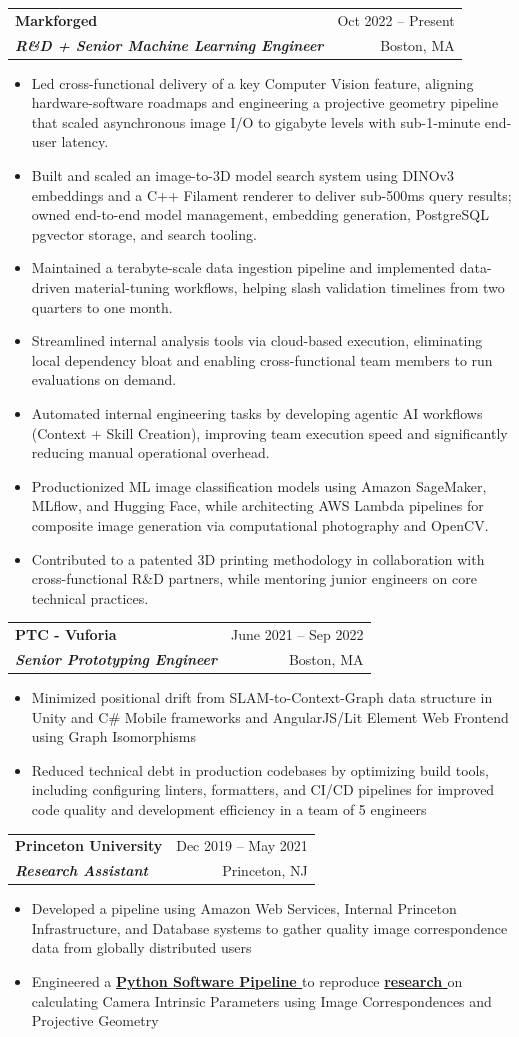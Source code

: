 \documentclass[letterpaper,10pt]{article}
\makeatletter
\renewcommand{\textbf}[1]{\textcolor{title}{\bfseries #1}}
\newcommand{\resumeItem}[1]{
\item\footnotesize{
    {#1 \vspace{-1pt}}
  }
}
\newcommand{\resumeSubheading}[4]{
  \vspace{-1pt}
\item
  \begin{tabular*}{\textwidth}[t]{l@{\extracolsep{\fill}}r}
    \textbf{#1} & {\color{dark-grey}\small #2}\vspace{1pt}\\ %
    \textit{#3} & {\color{dark-grey} \small #4}\\ %
  \end{tabular*}\vspace{-4pt}
}
\newcommand{\resumeItemListStart}{
\begin{itemize}}
\newcommand{\resumeItemListEnd}{
\end{itemize}\vspace{0pt}}
\makeatother
\begin{document}
\resumeSubheading
{\textbf{Markforged}}{Oct 2022 -- Present}
{\textbf{R\&D + Senior Machine Learning Engineer}}{Boston, MA}
\resumeItemListStart
  \resumeItem{Led cross-functional delivery of a key Computer Vision feature, aligning hardware-software roadmaps and engineering a projective geometry pipeline that scaled asynchronous image I/O to gigabyte levels with sub-1-minute end-user latency.}
  \resumeItem{Built and scaled an image-to-3D model search system using DINOv3 embeddings and a C++ Filament renderer to deliver sub-500ms query results; owned end-to-end model management, embedding generation, PostgreSQL pgvector storage, and search tooling.}
  \resumeItem{Maintained a terabyte-scale data ingestion pipeline and implemented data-driven material-tuning workflows, helping slash validation timelines from two quarters to one month.}
  \resumeItem{Streamlined internal analysis tools via cloud-based execution, eliminating local dependency bloat and enabling cross-functional team members to run evaluations on demand.}
  \resumeItem{Automated internal engineering tasks by developing agentic AI workflows (Context + Skill Creation), improving team execution speed and significantly reducing manual operational overhead.}
  \resumeItem{Productionized ML image classification models using Amazon SageMaker, MLflow, and Hugging Face, while architecting AWS Lambda pipelines for composite image generation via computational photography and OpenCV.}
  \resumeItem{Contributed to a patented 3D printing methodology in collaboration with cross-functional R\&D partners, while mentoring junior engineers on core technical practices.}
\resumeItemListEnd

\resumeSubheading
{\textbf{PTC - Vuforia}}{June 2021 -- Sep 2022}
{\textbf{Senior Prototyping Engineer}}{Boston, MA}
\resumeItemListStart
\resumeItem{Minimized positional drift from SLAM-to-Context-Graph data structure in Unity and C\# Mobile frameworks and AngularJS/Lit Element Web Frontend using Graph Isomorphisms}
\resumeItem{Reduced technical debt in production codebases by optimizing build tools, including configuring linters, formatters, and CI/CD pipelines for improved code quality and development efficiency in a team of 5 engineers}
\resumeItemListEnd

\resumeSubheading
{\textbf{Princeton University}}{Dec 2019 -- May 2021}
{\textbf{Research Assistant}}{Princeton, NJ}
\resumeItemListStart
\resumeItem{Developed a pipeline using Amazon Web Services, Internal Princeton Infrastructure, and Database systems to gather quality image correspondence data from globally distributed users}
\resumeItem{Engineered a \textbf{\href{https://github.com/johanos/pollefeys-self-calibration-and-metric-reconstruction}{\textcolor{title!70}{Python Software Pipeline \faIcon{link}}}} to reproduce \textbf{\href{https://people.inf.ethz.ch/pomarc/pubs/PollefeysIJCV99.pdf}{\textcolor{title!70}{research \faIcon{link}}}} on calculating Camera Intrinsic Parameters using Image Correspondences and Projective Geometry}
\resumeItemListEnd
\end{document}
